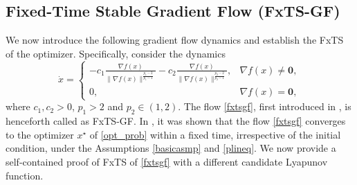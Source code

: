\documentclass[letterpaper]{article}
\newtheorem{lemma}{Lemma} %
\begin{document}



\subsection{Fixed-Time Stable Gradient Flow (FxTS-GF)}
We now introduce the following gradient flow dynamics and establish the FxTS of the optimizer. Specifically, consider the dynamics
\begin{equation} \label{fxtsgf}
\dot{x} =\begin{cases}
-c_1\frac{\nabla f(x)}{\|\nabla f(x)\|^{\frac{p_1-2}{p_1-1}}} -c_2\frac{\nabla f(x)}{\|\nabla f(x)\|^{\frac{p_2-2}{p_2-1}}}, & \nabla f(x) \neq \bm{0},\\
0, & \nabla f(x) = \bm{0},
\end{cases}
\end{equation}
where $c_1,c_2 >0$, $p_1>2$ and $p_2 \in (1,2)$. The flow \eqref{fxtsgf}, first introduced in \cite{kunal2021}, is henceforth called as FxTS-GF. In \cite{kunal2021}, it was shown that the flow \eqref{fxtsgf} converges to the optimizer $x^\star$ of \eqref{opt_prob} within a fixed time, irrespective of the initial condition, under the Assumptions \ref{basicasmp} and \ref{plineq}. We now provide a self-contained proof of FxTS of \eqref{fxtsgf} with a different candidate Lyapunov function.

\end{document}
